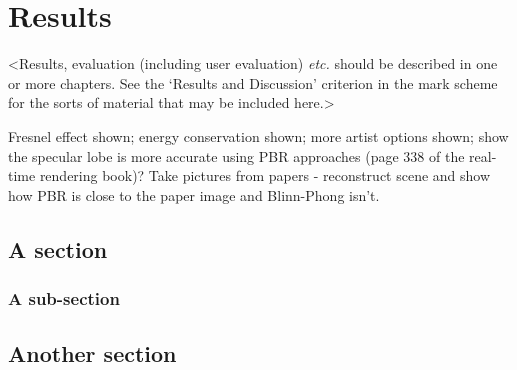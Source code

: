 \chapter{Results}
\label{chapter3}

<Results, evaluation (including user evaluation) {\em etc.} should be described in one or more chapters. See the `Results and Discussion' criterion in the mark scheme for the sorts of material that may be included here.>

Fresnel effect shown; energy conservation shown; more artist options shown; show the specular lobe is more accurate using PBR approaches (page 338 of the real-time rendering book)? Take pictures from papers - reconstruct scene and show how PBR is close to the paper image and Blinn-Phong isn't.

\section{A section}
\lipsum[8]

\subsection{A sub-section}
\lipsum[11]

\section{Another section}
\lipsum[12]
